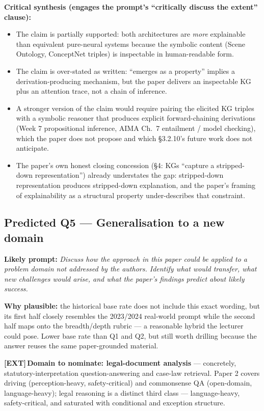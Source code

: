 \documentclass[11pt, a4paper]{article}
\newcommand{\extflag}{\textcolor{trapBd}{\textbf{[EXT]}}\,}
\begin{document}
\textbf{Critical synthesis (engages the prompt's ``critically discuss the extent'' clause):}
\begin{itemize}
  \item The claim is partially supported: both architectures are \emph{more} explainable than equivalent pure-neural systems because the symbolic content (Scene Ontology, ConceptNet triples) is inspectable in human-readable form.
  \item The claim is over-stated as written: ``emerges as a property'' implies a derivation-producing mechanism, but the paper delivers an inspectable KG plus an attention trace, not a chain of inference.
  \item A stronger version of the claim would require pairing the elicited KG triples with a symbolic reasoner that produces explicit forward-chaining derivations (Week 7 propositional inference, AIMA Ch.\ 7 entailment / model checking), which the paper does not propose and which §3.2.10's future work does not anticipate.
  \item The paper's own honest closing concession (§4: KGs ``capture a stripped-down representation'') already understates the gap: stripped-down representation produces stripped-down explanation, and the paper's framing of explainability as a structural property under-describes that constraint.
\end{itemize}

\subsection{Predicted Q5 — Generalisation to a new domain}

\textbf{Likely prompt:} \emph{Discuss how the approach in this paper could be applied to a problem domain not addressed by the authors. Identify what would transfer, what new challenges would arise, and what the paper's findings predict about likely success.}

\textbf{Why plausible:} the historical base rate does not include this exact wording, but its first half closely resembles the 2023/2024 real-world prompt while the second half maps onto the breadth/depth rubric — a reasonable hybrid the lecturer could pose. Lower base rate than Q1 and Q2, but still worth drilling because the answer reuses the same paper-grounded material.

\extflag{}\textbf{Domain to nominate: legal-document analysis} — concretely, statutory-interpretation question-answering and case-law retrieval. Paper 2 covers driving (perception-heavy, safety-critical) and commonsense QA (open-domain, language-heavy); legal reasoning is a distinct third class — language-heavy, safety-critical, and saturated with conditional and exception structure.
\end{document}
